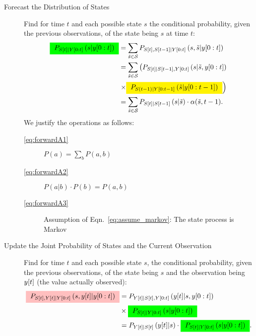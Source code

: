 \begin{description}
\item[Forecast the Distribution of States] Find for time $t$ and each
  possible state $s$ the conditional probability, given the
  previous observations, of the state being $s$ at time $t$:
  \begin{subequations}
    \label{eq:forwardA}
    \begin{align}
      \mlabel{eq:forwardA1}
      \prealpha & = \sum_{{\tilde s}\in\states}
      P_{\ti{S}{t},\ti{S}{t-1}|\ts{Y}{0}{t}} \left( s, {\tilde s}
      |\ts{y}{0}{t} \right)\\
      \mlabel{eq:forwardA2}
      & = \sum_{{\tilde s}\in\states} \left(
        P_{\ti{S}{t}|\ti{S}{t-1},\ts{Y}{0}{t}}
        \left( s|{\tilde s},\ts{y}{0}{t} \right) \right. \nonumber \\ &
      \left. \times \alphax{t-1}{{\tilde s}} \right) \\
      \mlabel{eq:forwardA3}
      & = \sum_{{\tilde s}\in\states} P_{\ti{S}{t}|\ti{S}{t-1}} \left( s|{\tilde s} \right)
      \cdot \alpha({\tilde s},t-1) .
    \end{align}
  \end{subequations}
  We justify the operations as follows:
  \begin{description}
  \item[\eqref{eq:forwardA1}] $P(a) = \sum_b P(a,b)$
  \item[\eqref{eq:forwardA2}] $P(a|b)\cdot P(b) = P(a,b)$
  \item[\eqref{eq:forwardA3}] Assumption of
    Eqn.~\eqref{eq:assume_markov}: The state process is Markov
  \end{description}
\item[Update the Joint Probability of States and the Current
  Observation] Find for time $t$ and each possible state $s$, the
  conditional probability, given the previous observations, of the
  state being $s$ and the observation being ${y}{[t]}$ (the value
  actually observed):
  \begin{subequations}
    \label{eq:forwardB}
    \begin{align}
      \mlabel{eq:forwardB1}
      \pregamma &= P_{\ti{Y}{t} |
        \ti{S}{t},\ts{Y}{0}{t}}\left(\ti{y}{t} |s, \ts{y}{0}{t}
      \right) \nonumber \\& \times \prealpha\\
      \mlabel{eq:forwardB2}
      &= P_{\ti{Y}{t} | \ti{S}{t}}\left(\ti{y}{t} |s \right) \cdot
      \prealpha .
    \end{align}

\end{subequations}
\end{description}
